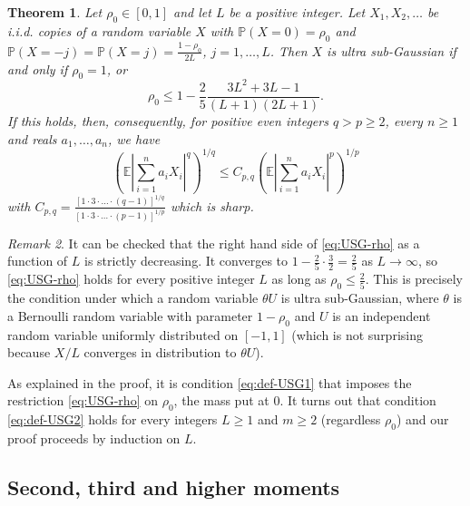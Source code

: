 \documentclass[10pt]{article}
\newcommand{\E}{\mathbb{E}}
\newcommand{\1}{\textbf{1}}
\newcommand{\p}[1]{\mathbb{P}\left( #1 \right)}
\newtheorem{theorem}{Theorem}
\theoremstyle{remark}
\newtheorem{remark}[theorem]{Remark}
\theoremstyle{definition}
\begin{document}
\begin{theorem}\label{thm:USG}
Let $\rho_0 \in [0,1]$ and let $L$ be a positive integer. Let $X_1, X_2,\dots$ be i.i.d. copies of a random variable $X$ with $\p{X=0} = \rho_0$ and $\p{X = -j} = \p{X = j} = \frac{1-\rho_0}{2L}$, $j = 1,\dots,L$. Then $X$ is ultra sub-Gaussian if and only if $\rho_0 = 1$, or
\begin{equation}\label{eq:USG-rho}
\rho_0 \leq 1 - \frac{2}{5}\frac{3L^2+3L-1}{(L+1)(2L+1)}.
\end{equation}
If this holds, then, consequently, for positive even integers $q > p \geq 2$, every $n \geq 1$ and reals $a_1,\dots,a_n$, we have
\begin{equation}\label{eq:Khin-even}
\left(\E\left|\sum_{i=1}^n a_iX_i\right|^q\right)^{1/q} \leq C_{p,q}\left(\E\left|\sum_{i=1}^n a_iX_i\right|^p\right)^{1/p}
\end{equation}
with $C_{p,q} = \frac{[1\cdot 3\cdot\ldots \cdot (q-1)]^{1/q}}{[1\cdot 3\cdot\ldots \cdot (p-1)]^{1/p}}$ which is sharp.
\end{theorem}

\begin{remark}\label{rem:USG-rho}
It can be checked that the right hand side of \eqref{eq:USG-rho} as a function of $L$ is strictly decreasing. It converges to $1 - \frac{2}{5}\cdot \frac{3}{2} = \frac{2}{5}$ as $L \to \infty$, so \eqref{eq:USG-rho} holds for every positive integer $L$ as long as $\rho_0 \leq \frac{2}{5}$. This is precisely the condition under which a random variable $\theta U$ is ultra sub-Gaussian, where $\theta$ is a Bernoulli random variable with parameter $1-\rho_0$ and $U$ is an independent random variable uniformly distributed on $[-1,1]$ (which is not surprising because $X/L$ converges in distribution to $\theta U$).
\end{remark}


As explained in the proof, it is condition \eqref{eq:def-USG1} that imposes the restriction \eqref{eq:USG-rho} on $\rho_0$, the mass put at $0$. It turns out that condition \eqref{eq:def-USG2} holds for every integers $L \geq 1$ and $m \geq 2$ (regardless $\rho_0$) and our proof proceeds by induction on $L$. 


\subsection{Second, third and higher moments}
\end{document}
